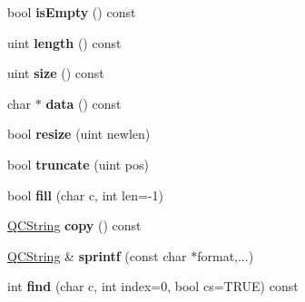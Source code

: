 \begin{DoxyCompactItemize}
\item 
\hypertarget{class_q_c_string_a479432127ee77145cc19d6a2d1590821}{bool {\bfseries is\-Empty} () const }\label{class_q_c_string_a479432127ee77145cc19d6a2d1590821}

\item 
\hypertarget{class_q_c_string_ab0edbf251efc0562d70132e931e3cf06}{uint {\bfseries length} () const }\label{class_q_c_string_ab0edbf251efc0562d70132e931e3cf06}

\item 
\hypertarget{class_q_c_string_a7e63723212bed1ca52f0fe57e58b812e}{uint {\bfseries size} () const }\label{class_q_c_string_a7e63723212bed1ca52f0fe57e58b812e}

\item 
\hypertarget{class_q_c_string_ad9319003da5b44fcac43001237ecb9cd}{char $\ast$ {\bfseries data} () const }\label{class_q_c_string_ad9319003da5b44fcac43001237ecb9cd}

\item 
\hypertarget{class_q_c_string_a378c0f518d23c55f949bd0dd39c87849}{bool {\bfseries resize} (uint newlen)}\label{class_q_c_string_a378c0f518d23c55f949bd0dd39c87849}

\item 
\hypertarget{class_q_c_string_a1546e903bdbf7b496b4f8b05a5ff908d}{bool {\bfseries truncate} (uint pos)}\label{class_q_c_string_a1546e903bdbf7b496b4f8b05a5ff908d}

\item 
\hypertarget{class_q_c_string_a31c02c2c1d3805a87e49dd877b0ca0bd}{bool {\bfseries fill} (char c, int len=-\/1)}\label{class_q_c_string_a31c02c2c1d3805a87e49dd877b0ca0bd}

\item 
\hypertarget{class_q_c_string_ae62ab8dc19e6a119ca928bf380f94ed5}{\hyperlink{class_q_c_string}{Q\-C\-String} {\bfseries copy} () const }\label{class_q_c_string_ae62ab8dc19e6a119ca928bf380f94ed5}

\item 
\hypertarget{class_q_c_string_aa928b0330a17150b186334d65af1dad3}{\hyperlink{class_q_c_string}{Q\-C\-String} \& {\bfseries sprintf} (const char $\ast$format,...)}\label{class_q_c_string_aa928b0330a17150b186334d65af1dad3}

\item 
\hypertarget{class_q_c_string_ad64e3aef2a281ce7550aee1970a86a7e}{int {\bfseries find} (char c, int index=0, bool cs=T\-R\-U\-E) const }\label{class_q_c_string_ad64e3aef2a281ce7550aee1970a86a7e}


\end{DoxyCompactItemize}
